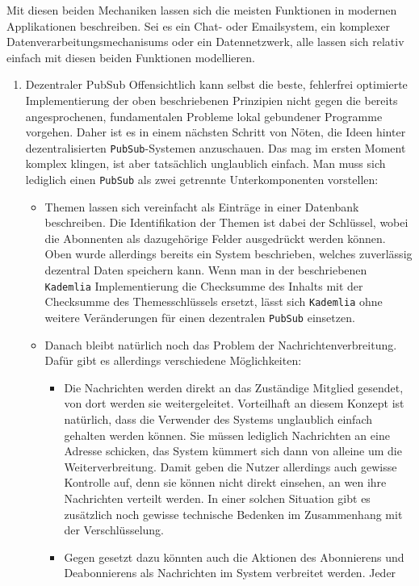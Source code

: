 \documentclass[a4paper,11pt,titlepage,twoside]{memoir}
\begin{document}
\noindent Mit diesen beiden Mechaniken lassen sich die meisten
Funktionen in modernen Applikationen beschreiben. Sei es ein Chat-
oder Emailsystem, ein komplexer Datenverarbeitungsmechanisums oder ein
Datennetzwerk, alle lassen sich relativ einfach mit diesen beiden
Funktionen modellieren. 
\begin{enumerate}
\item Dezentraler PubSub
\label{sec:orgd6768b2}
Offensichtlich kann selbst die beste, fehlerfrei optimierte
Implementierung der oben beschriebenen Prinzipien nicht gegen die
bereits angesprochenen, fundamentalen Probleme lokal gebundener
Programme vorgehen. Daher ist es in einem nächsten Schritt von Nöten,
die Ideen hinter dezentralisierten \texttt{PubSub}-Systemen anzuschauen. Das
mag im ersten Moment komplex klingen, ist aber tatsächlich unglaublich
einfach. Man muss sich lediglich einen \texttt{PubSub} als zwei getrennte
Unterkomponenten vorstellen:
\begin{itemize}
\item Themen lassen sich vereinfacht als Einträge in einer Datenbank
beschreiben. Die Identifikation der Themen ist dabei der Schlüssel,
wobei die Abonnenten als dazugehörige Felder ausgedrückt werden
können. Oben wurde allerdings bereits ein System beschrieben,
welches zuverlässig dezentral Daten speichern kann. Wenn man in der
beschriebenen \texttt{Kademlia} Implementierung die Checksumme des Inhalts
mit der Checksumme des Themesschlüssels ersetzt, lässt sich \texttt{Kademlia}
ohne weitere Veränderungen für einen dezentralen \texttt{PubSub} einsetzen.
\item Danach bleibt natürlich noch das Problem der Nachrichtenverbreitung.
Dafür gibt es allerdings verschiedene Möglichkeiten:
\begin{itemize}
\item Die Nachrichten werden direkt an das Zuständige Mitglied gesendet,
von dort werden sie weitergeleitet. Vorteilhaft an diesem Konzept
ist natürlich, dass die Verwender des Systems unglaublich einfach
gehalten werden können. Sie müssen lediglich Nachrichten an eine
Adresse schicken, das System kümmert sich dann von alleine um die
Weiterverbreitung. Damit geben die Nutzer allerdings auch gewisse
Kontrolle auf, denn sie können nicht direkt einsehen, an wen ihre
Nachrichten verteilt werden. In einer solchen Situation gibt es
zusätzlich noch gewisse technische Bedenken im Zusammenhang mit
der Verschlüsselung.
\item Gegen gesetzt dazu könnten auch die Aktionen des Abonnierens und
Deabonnierens als Nachrichten im System verbreitet werden. Jeder

\end{itemize}
\end{itemize}
\end{enumerate}
\end{document}
